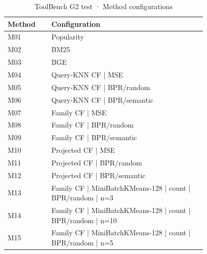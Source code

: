 \begin{table}
\caption{ToolBench G2 test · Method configurations}
\label{tab:ToolBench-G2-test-comparison-comparison-methods}
\begin{tabular}{lp{0.78\linewidth}}
\toprule
Method & Configuration \\
\midrule
M01 & Popularity \\
M02 & BM25 \\
M03 & BGE \\
M04 & Query-KNN CF | MSE \\
M05 & Query-KNN CF | BPR/random \\
M06 & Query-KNN CF | BPR/semantic \\
M07 & Family CF | MSE \\
M08 & Family CF | BPR/random \\
M09 & Family CF | BPR/semantic \\
M10 & Projected CF | MSE \\
M11 & Projected CF | BPR/random \\
M12 & Projected CF | BPR/semantic \\
M13 & Family CF | MiniBatchKMeans-128 | count | BPR/random | n=3 \\
M14 & Family CF | MiniBatchKMeans-128 | count | BPR/random | n=10 \\
M15 & Family CF | MiniBatchKMeans-128 | count | BPR/random | n=5 \\
\bottomrule
\end{tabular}
\end{table}
